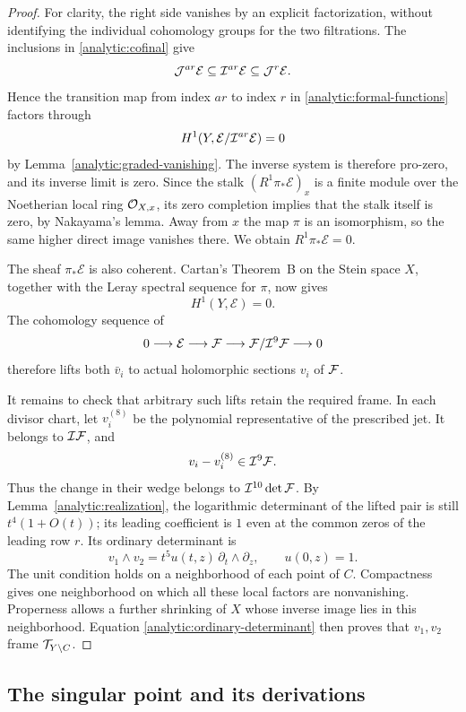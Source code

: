 \begin{proof}
For clarity, the right side vanishes by an explicit factorization,
without identifying the individual cohomology groups for the two
filtrations.  The inclusions in \eqref{analytic:cofinal} give
\[
 \mathcal J^{ar}\mathcal E
 \subseteq\mathcal I^{ar}\mathcal E
 \subseteq\mathcal J^r\mathcal E.
\]
Hence the transition map from index $ar$ to index $r$ in
\eqref{analytic:formal-functions} factors through
\[
 H^1(Y,\mathcal E/\mathcal I^{ar}\mathcal E)=0
\]
by Lemma~\ref{analytic:graded-vanishing}.  The inverse system is
therefore pro-zero, and its inverse limit is zero.  Since the stalk
$(R^1\pi_*\mathcal E)_x$ is a finite module over the Noetherian
local ring $\mathcal O_{X,x}$, its zero completion implies that the stalk
itself is zero, by Nakayama's lemma.  Away from $x$ the map $\pi$
is an isomorphism, so the same higher direct image vanishes there.
We obtain $R^1\pi_*\mathcal E=0$.

The sheaf $\pi_*\mathcal E$ is also coherent.  Cartan's
Theorem~B on the Stein space $X$, together with the Leray spectral
sequence for $\pi$, now gives
\[
 H^1(Y,\mathcal E)=0.
\]
The cohomology sequence of
\[
 0\longrightarrow\mathcal E\longrightarrow\mathcal F
 \longrightarrow\mathcal F/\mathcal I^9\mathcal F\longrightarrow0
\]
therefore lifts both $\bar v_i$ to actual holomorphic sections $v_i$
of $\mathcal F$.

It remains to check that arbitrary such lifts retain the required
frame.  In each divisor chart, let $v_i^{(8)}$ be the polynomial
representative of the prescribed jet.  It belongs to $\mathcal I\mathcal F$, and
\[
 v_i-v_i^{(8)}\in\mathcal I^9\mathcal F.
\]
Thus the change in their wedge belongs to
$\mathcal I^{10}\det\mathcal F$.  By Lemma~\ref{analytic:realization}, the
logarithmic determinant of the lifted pair is still
$t^4(1+O(t))$; its leading coefficient is $1$ even at the common
zeros of the leading row $r$.  Its ordinary determinant is
\begin{equation}\label{analytic:ordinary-determinant}
 v_1\wedge v_2=t^5 u(t,z)\,\partial_t\wedge\partial_z,
 \qquad u(0,z)=1.
\end{equation}
The unit condition holds on a neighborhood of each point of $C$.
Compactness gives one neighborhood on which all these local factors
are nonvanishing.  Properness allows a further shrinking of $X$
whose inverse image lies in this neighborhood.  Equation
\eqref{analytic:ordinary-determinant} then proves that $v_1,v_2$
frame $\mathcal T_{Y\setminus C}$.
\end{proof}

\subsection{The singular point and its derivations}

